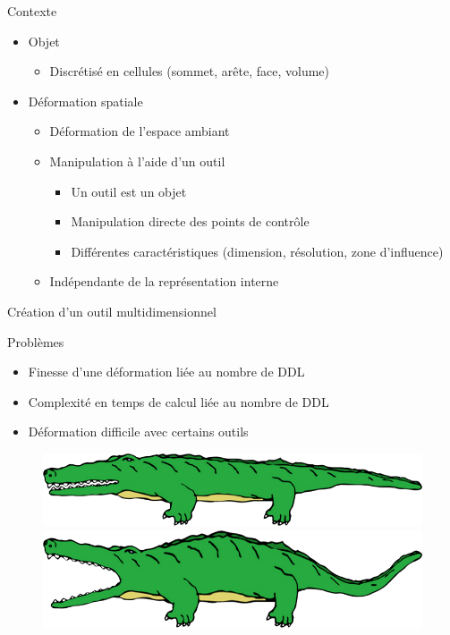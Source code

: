 \documentclass[xcolor=x11names,compress]{beamer}
\renewcommand{\(}{\begin{columns}} \renewcommand{\)}{\end{columns}}
\newcommand{\<}[1]{\begin{column}{#1}} \renewcommand{\>}{\end{column}}
\begin{document}
\begin{frame}{Contexte}
  \begin{itemize}
  \item Objet
    \begin{itemize}
    \item Discrétisé en cellules (sommet, arête, face, volume)
    \end{itemize}
  \item Déformation spatiale
    \begin{itemize}
    \item Déformation de l'espace ambiant
    \item Manipulation à l'aide d'un outil
      \begin{itemize}
      \item Un outil est un objet
      \item Manipulation directe des points de contrôle
      \item Différentes caractéristiques (dimension, résolution, zone
        d'influence)
      \end{itemize}
    \item Indépendante de la représentation interne
    \end{itemize}
  \end{itemize}
\end{frame}

\begin{frame}{Création d'un outil multidimensionnel}
  \begin{alertblock}{Problèmes}
    \begin{itemize}
    \item Finesse d'une déformation liée au nombre de DDL
    \item Complexité en temps de calcul liée au nombre de DDL
    \item Déformation difficile avec certains outils
    \end{itemize}
  \end{alertblock}
  \begin{figure}[h]
    \begin{center}
      \includegraphics[scale=0.15]{alligator-ferme}
      \includegraphics[scale=0.15]{alligator-ouvert}
    \end{center}
    \caption{\citep{JBPS11}}
  \end{figure}
\end{frame}
\end{document}
